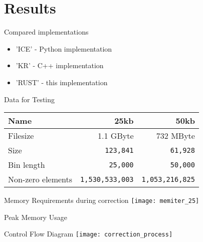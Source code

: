 


\section{Results}


\begin{frame}[c]{Compared implementations}
    \begin{itemize}[<+(1)->]
        \item 'ICE' - Python implementation
        \item 'KR' - C++ implementation
        \item 'RUST' - this implementation
    \end{itemize}
\end{frame}



\begin{frame}[c,fragile]{Data for Testing}
    \normalsize
    \begin{tabular}{@{}lrr@{}}
        \textbf{Name}       & 25kb          & 50kb \\
        \hline
        Filesize            & 1.1 GByte     & 732 MByte     \\
        Size                & \verb|123,841|       & \verb|61,928| \\
        Bin length          & \verb|25,000|        & \verb|50,000| \\
        Non-zero elements   & \verb|1,530,533,003| & \verb|1,053,216,825| \\
    \end{tabular}
\end{frame}




\begin{frame}[c]{Memory Requirements during correction}
    \texttt{[image: memiter\_25]}
\end{frame}


\begin{frame}[c]{Peak Memory Usage}
\end{frame}

\begin{frame}[c]{Control Flow Diagram}
    \pause
    \texttt{[image: correction\_process]}
\end{frame}

